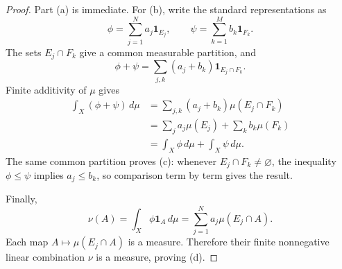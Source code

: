 \begin{proof}
  Part (a) is immediate.  For (b), write the standard representations
  as
  \[
    \phi=\sum_{j=1}^{N}a_j\mathbf 1_{E_j},
    \qquad
    \psi=\sum_{k=1}^{M}b_k\mathbf 1_{F_k}.
  \]
  The sets $E_j\cap F_k$ give a common measurable partition, and
  \[
    \phi+\psi
      =\sum_{j,k}(a_j+b_k)\mathbf 1_{E_j\cap F_k}.
  \]
  Finite additivity of $\mu$ gives
  \begin{align*}
    \int_X(\phi+\psi)\,d\mu
      &=\sum_{j,k}(a_j+b_k)\mu(E_j\cap F_k)\\
      &=\sum_j a_j\mu(E_j)+\sum_k b_k\mu(F_k)\\
      &=\int_X\phi\,d\mu+\int_X\psi\,d\mu.
  \end{align*}
  The same common partition proves (c): whenever
  $E_j\cap F_k\neq\varnothing$, the inequality $\phi\leq\psi$ implies
  $a_j\leq b_k$, so comparison term by term gives the result.

  Finally,
  \[
    \nu(A)
      =\int_X\phi\mathbf 1_A\,d\mu
      =\sum_{j=1}^{N}a_j\mu(E_j\cap A).
  \]
  Each map $A\mapsto\mu(E_j\cap A)$ is a measure.  Therefore their
  finite nonnegative linear combination $\nu$ is a measure, proving
  (d).
\end{proof}
